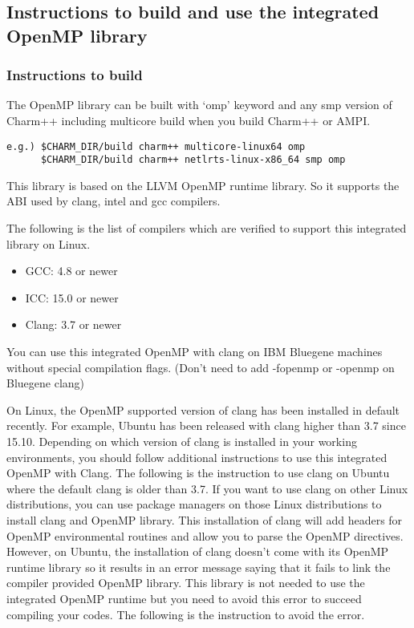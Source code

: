 \subsection{Instructions to build and use the integrated OpenMP library}
\subsubsection{Instructions to build}
The OpenMP library can be built with `omp' keyword and any smp version of Charm++ including multicore build when you build Charm++ or AMPI.\\
\begin{verbatim}
e.g.) $CHARM_DIR/build charm++ multicore-linux64 omp
      $CHARM_DIR/build charm++ netlrts-linux-x86_64 smp omp
\end{verbatim}
This library is based on the LLVM OpenMP runtime library. So it supports the ABI used by clang, intel and gcc compilers.

The following is the list of compilers which are verified to support this integrated library on Linux.
\begin{itemize}
  \item GCC: 4.8 or newer
  \item ICC: 15.0 or newer
  \item Clang: 3.7 or newer
\end{itemize}

You can use this integrated OpenMP with clang on IBM Bluegene machines without special compilation flags.
(Don't need to add -fopenmp or -openmp on Bluegene clang)

On Linux, the OpenMP supported version of clang has been installed in default recently. For example,
Ubuntu has been released with clang higher than 3.7 since 15.10.
Depending on which version of clang is installed in your working environments, you should follow additional instructions
to use this integrated OpenMP with Clang. The following is the instruction to use
clang on Ubuntu where the default clang is older than 3.7. If you want to use clang on other Linux
distributions, you can use package managers on those Linux distributions to install clang and OpenMP library.
This installation of clang will add headers for OpenMP environmental routines and allow you to parse the OpenMP directives.
However, on Ubuntu, the installation of clang doesn't come with its OpenMP runtime library so it results in an error message saying that
it fails to link the compiler provided OpenMP library. This library is not needed to use the integrated OpenMP runtime but you
need to avoid this error to succeed compiling your codes. The following is the instruction to avoid the error.

